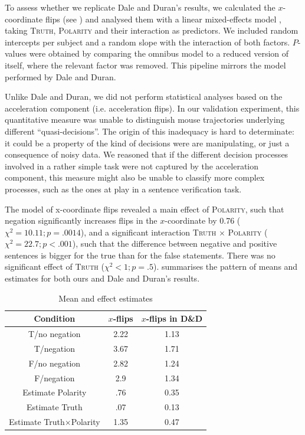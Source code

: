 \documentclass{article}
\begin{document}
To assess whether we replicate Dale and Duran's results, we calculated the $x$-coordinate flips (see ) and analysed them with a linear mixed-effects model \citep{baayen2008mixed}, taking \textsc{Truth}, \textsc{Polarity} and their interaction as predictors. We included random intercepts per subject and a random slope with the interaction of both factors. $P$-values were obtained by comparing the omnibus model to a reduced version of itself, where the relevant factor was removed. This pipeline mirrors the model performed by Dale and Duran. 

Unlike Dale and Duran, we did not perform statistical analyses based on the acceleration component (i.e. acceleration flips). 
In our validation experiment, this quantitative measure was unable to distinguish mouse trajectories underlying different ``quasi-decisions''.
The origin of this inadequacy is hard to determinate: it could be a property of the kind of decisions were are manipulating, or just a consequence of noisy data. We reasoned that if the different decision processes involved in a rather simple task were not captured by the acceleration component, this measure might also be unable to classify more complex processes, such as the ones at play in a sentence verification task. 

The model of x-coordinate flips revealed a main effect of \textsc{Polarity}, such that negation significantly increases flips in the $x$-coordinate by 0.76 ($\chi^{2}=10.11; p=.0014$), and a significant interaction \textsc{Truth} $\times$ \textsc{Polarity} ($\chi^{2}=22.7; p<.001$), such that the difference between negative and positive sentences is bigger for the true than for the false statements. There was no significant effect of \textsc{Truth} ($\chi^{2}<1; p=.5$). 
 summarises the pattern of means and estimates for both ours and Dale and Duran's results. 

\begin{table}[h]
\begin{center}
\begin{tabular}{ccc}
Condition & $x$-flips &  $x$-flips in D\&D \\
\hline
T/no negation & 2.22 & 1.13 \\
T/negation & 3.67 & 1.71 \\
F/no negation & 2.82 & 1.24 \\
F/negation & 2.9 & 1.34 \\
Estimate Polarity & .76 & 0.35 \\
Estimate Truth & .07 & 0.13 \\
Estimate Truth$\times$Polarity & 1.35 & 0.47\\
\end{tabular}
\caption{Mean and effect estimates}
\label{table:negationresults}
\end{center}
\end{table}%
\end{document}
